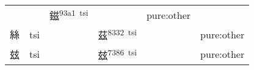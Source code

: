\documentclass[14pt,a4paper]{scrartcl}
\begin{document}
\begin{longtable}[c]{@{}llllll@{}}
\begin{minipage}[t]{0.14\columnwidth}
\strut\end{minipage} &
\begin{minipage}[t]{0.14\columnwidth}\raggedright\strut
\strut\end{minipage} &
\begin{minipage}[t]{0.14\columnwidth}\raggedright\strut
鎡\textsuperscript{93a1~tsi}
\strut\end{minipage} &
\begin{minipage}[t]{0.14\columnwidth}\raggedright\strut
\strut\end{minipage} &
\begin{minipage}[t]{0.14\columnwidth}\raggedright\strut
pure:other
\strut\end{minipage}\tabularnewline
\begin{minipage}[t]{0.14\columnwidth}\raggedright\strut
絲
\strut\end{minipage} &
\begin{minipage}[t]{0.14\columnwidth}\raggedright\strut
tsi
\strut\end{minipage} &
\begin{minipage}[t]{0.14\columnwidth}\raggedright\strut
\strut\end{minipage} &
\begin{minipage}[t]{0.14\columnwidth}\raggedright\strut
茲\textsuperscript{8332~tsi}
\strut\end{minipage} &
\begin{minipage}[t]{0.14\columnwidth}\raggedright\strut
\strut\end{minipage} &
\begin{minipage}[t]{0.14\columnwidth}\raggedright\strut
pure:other
\strut\end{minipage}\tabularnewline
\begin{minipage}[t]{0.14\columnwidth}\raggedright\strut
玆
\strut\end{minipage} &
\begin{minipage}[t]{0.14\columnwidth}\raggedright\strut
tsi
\strut\end{minipage} &
\begin{minipage}[t]{0.14\columnwidth}\raggedright\strut
\strut\end{minipage} &
\begin{minipage}[t]{0.14\columnwidth}\raggedright\strut
玆\textsuperscript{7386~tsi}
\strut\end{minipage} &
\begin{minipage}[t]{0.14\columnwidth}\raggedright\strut
\strut\end{minipage} &
\begin{minipage}[t]{0.14\columnwidth}\raggedright\strut
pure:other
\strut\end{minipage}\tabularnewline
\bottomrule
\end{longtable}
\end{document}
